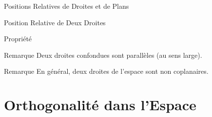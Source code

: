 \documentclass{coursbook}
\begin{document}
\begin{Gpartie}{Positions Relatives de Droites et de Plans}
\begin{Spartie}{Position Relative de Deux Droites}
\begin{SSpartie}{Propriété}
\begin{center}
                    \parbox{\linewidth}{}
                \end{center}
            \end{SSpartie}
            \vfill
            \begin{SSpartie}{Remarque} 
                Deux droites confondues sont parallèles (au sens large).
            \end{SSpartie}
            \begin{SSpartie}{Remarque} 
                En général, deux droites de l'espace sont non coplanaires.
            \end{SSpartie}
        \end{Spartie}
    \end{Gpartie}


    
    \chapter{Orthogonalité dans l'Espace}
    
\end{document}
